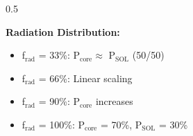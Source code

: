 \begin{frame}
\begin{columns}
\begin{column}{0.5\textwidth}
{            \textbf{Radiation Distribution:}
            \begin{itemize}
                \item f$_{\text{rad}}$ = 33\%: P$_{\text{core}}\approx$ P$_{\text{SOL}}$ (50/50)
                \item f$_{\text{rad}}$ = 66\%: Linear scaling
                \item f$_{\text{rad}}$ = 90\%: P$_{\text{core}}$ increases
                \item f$_{\text{rad}}$ = 100\%: P$_{\text{core}}$ = 70\%, P$_{\text{SOL}}$ = 30\%
            \end{itemize}
            }

        \end{column}
    \end{columns}

\end{frame}

